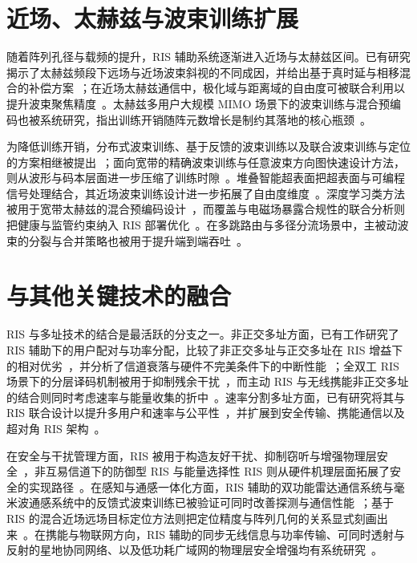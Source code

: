 \section{近场、太赫兹与波束训练扩展}

随着阵列孔径与载频的提升，RIS 辅助系统逐渐进入近场与太赫兹区间。已有研究揭示了太赫兹频段下远场与近场波束斜视的不同成因，并给出基于真时延与相移混合的补偿方案~\cite{hao2023ris}；在近场太赫兹通信中，极化域与距离域的自由度可被联合利用以提升波束聚焦精度~\cite{qiu2026ris}。太赫兹多用户大规模 MIMO 场景下的波束训练与混合预编码也被系统研究，指出训练开销随阵元数增长是制约其落地的核心瓶颈~\cite{ning2021ris}。

为降低训练开销，分布式波束训练、基于反馈的波束训练以及联合波束训练与定位的方案相继被提出~\cite{mei2021ris,cao2023ris,wang2021ris}；面向宽带的精确波束训练与任意波束方向图快速设计方法，则从波形与码本层面进一步压缩了训练时隙~\cite{chen2023ris,dang2023ris}。堆叠智能超表面把超表面与可编程信号处理结合，其近场波束训练设计进一步拓展了自由度维度~\cite{wei2026ris}。深度学习类方法被用于宽带太赫兹的混合预编码设计~\cite{yuan2024ris}，而覆盖与电磁场暴露合规性的联合分析则把健康与监管约束纳入 RIS 部署优化~\cite{melhem2025ris}。在多跳路由与多径分流场景中，主被动波束的分裂与合并策略也被用于提升端到端吞吐~\cite{mei2022ris}。

\section{与其他关键技术的融合}

RIS 与多址技术的结合是最活跃的分支之一。非正交多址方面，已有工作研究了 RIS 辅助下的用户配对与功率分配，比较了非正交多址与正交多址在 RIS 增益下的相对优劣~\cite{zheng2020ris}，并分析了信道衰落与硬件不完美条件下的中断性能~\cite{guo2021ris,hemanth2020ris}；全双工 RIS 场景下的分层译码机制被用于抑制残余干扰~\cite{andiappan2023ris}，而主动 RIS 与无线携能非正交多址的结合则同时考虑速率与能量收集的折中~\cite{cantos2024ris}。速率分割多址方面，已有研究将其与 RIS 联合设计以提升多用户和速率与公平性~\cite{bansal2021ris,zhang2024ris}，并扩展到安全传输、携能通信以及超对角 RIS 架构~\cite{gao2023ris,camana2022ris,li2024ris}。

在安全与干扰管理方面，RIS 被用于构造友好干扰、抑制窃听与增强物理层安全~\cite{jiang2020ris,xiu2020ris}，非互易信道下的防御型 RIS 与能量选择性 RIS 则从硬件机理层面拓展了安全的实现路径~\cite{chenhu2025ris,hong2026ris}。在感知与通感一体化方面，RIS 辅助的双功能雷达通信系统与毫米波通感系统中的反馈式波束训练已被验证可同时改善探测与通信性能~\cite{li2023ris,cao2023ris}；基于 RIS 的混合近场远场目标定位方法则把定位精度与阵列几何的关系显式刻画出来~\cite{zhu2026ris}。在携能与物联网方向，RIS 辅助的同步无线信息与功率传输、可同时透射与反射的星地协同网络、以及低功耗广域网的物理层安全增强均有系统研究~\cite{xie2025ris,khoshafa2024ris}。

